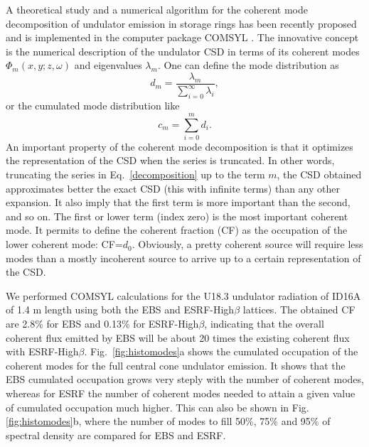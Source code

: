 \documentclass{iucr}              %
\begin{document}
A theoretical study and a numerical algorithm for the coherent mode decomposition of undulator emission in storage rings has been recently proposed  \cite{GlassThesis,GlassEPL} and is implemented in the computer package COMSYL \cite{codeCOMSYL}. The innovative concept is the numerical description of the undulator CSD in terms of its coherent modes $\Phi_m(x,y;z,\omega)$ and eigenvalues $\lambda_m $. One can define the mode distribution as
\begin{equation}
 d_m = \frac{\lambda_m}{\sum\limits_{i=0}^{\infty} \lambda_i},
\end{equation}
or the cumulated mode distribution like
\begin{equation}
 c_m = \sum\limits_{i=0}^{m} d_i.
\end{equation}
An important property of the coherent mode decomposition is that it optimizes the representation of the CSD when the series is truncated. In other words, truncating the series in Eq.~\ref{decomposition} up to the term $m$, the CSD obtained approximates better the exact CSD (this with infinite terms) than any other expansion. It also imply that the first term is more important than the second, and so on. The first or lower term (index zero) is the most important coherent mode. It permits to define the coherent fraction (CF) as the occupation of the lower coherent mode: CF=$d_0$. Obviously, a pretty coherent source will require less modes than a mostly incoherent source to arrive up to a certain representation of the CSD.

We performed COMSYL calculations for the U18.3 undulator radiation of ID16A of 1.4 m length using both the EBS and ESRF-High$\beta$ lattices. The obtained CF are 2.8\% for EBS and 0.13\% for ESRF-High$\beta$, indicating that the overall coherent flux emitted by EBS will be about 20 times the existing coherent flux with ESRF-High$\beta$. Fig.~\ref{fig:histomodes}a shows the cumulated occupation of the coherent modes for the full central cone undulator emission. It shows that the EBS cumulated occupation grows very steply with the number of coherent modes, whereas for ESRF the number of coherent modes needed to attain a given value of cumulated occupation much higher. This can also be shown in Fig.\ref{fig:histomodes}b, where the number of modes to fill 50\%, 75\% and 95\% of spectral density are compared for EBS and ESRF.   
\end{document}
